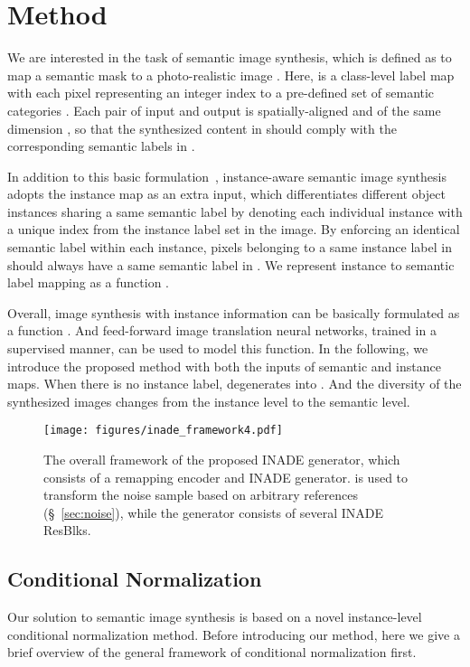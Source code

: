 \documentclass[final]{cvpr}
\begin{document}
\section{Method}
We are interested in the task of semantic image synthesis, which is defined as to map a semantic mask  to a photo-realistic image . Here,  is a class-level label map with each pixel representing an integer index to a pre-defined set of semantic categories . Each pair of input  and output  is spatially-aligned and of the same dimension , so that the synthesized content in  should comply with the corresponding semantic labels in .

In addition to this basic formulation~\cite{wang2018high,park2019semantic,tan2020semantic}, instance-aware semantic image synthesis~\cite{dundar2020panoptic} adopts the instance map  as an extra input, which differentiates different object instances sharing a same semantic label by denoting each individual instance with a unique index from the instance label set  in the image. By enforcing an identical semantic label within each instance, pixels belonging to a same instance label  in  should always have a same semantic label  in . We represent instance to semantic label mapping as a function .

Overall, image synthesis with instance information can be basically formulated as a function . And feed-forward image translation neural networks, trained in a supervised manner, can be used to model this function. In the following, we introduce the proposed method with both the inputs of semantic and instance maps. When there is no instance label,  degenerates into . And the diversity of the synthesized images changes from the instance level to the semantic level.

 \begin{figure*}[t]
  \centering
  \texttt{[image: figures/inade\_framework4.pdf]}
  \caption{The overall framework of the proposed INADE generator, which consists of a remapping encoder  and INADE generator.  is used to transform the noise sample based on arbitrary references (\S~\ref{sec:noise}), while the generator consists of several INADE ResBlks.}
  \label{fig:generator}
\end{figure*}

\subsection{Conditional Normalization}
\label{sec:normalization}
Our solution to semantic image synthesis is based on a novel instance-level conditional normalization method. Before introducing our method, here we give a brief overview of the general framework of conditional normalization first.
\end{document}
